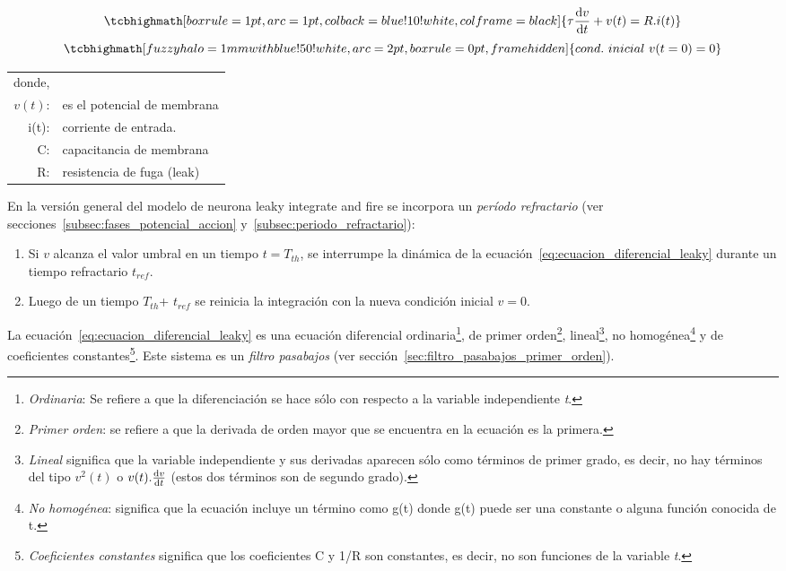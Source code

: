 \begin{equation}\label{eq:ecuacion_diferencial_leaky}
    \tcbhighmath[boxrule=1pt,arc=1pt,colback=blue!10!white,colframe=black]{\tau \dv{v}{t} + v(t) = R.i(t)}
\end{equation}
\[\tcbhighmath[fuzzy halo=1mm with blue!50!white,arc=2pt,
  boxrule=0pt,frame hidden]{cond.\ inicial\ v(t=0)= 0}\]
\begin{center}
\begin{tabular}{ r l}
\footnotesize{donde,}&\\
 \footnotesize{$v(t)$:}& \footnotesize{es el potencial de membrana}\\ 
 \footnotesize{i(t)}:& \footnotesize{corriente de entrada.}\\
 \footnotesize{C:}& \footnotesize{capacitancia de membrana}\\
 \footnotesize{R}:& \footnotesize{resistencia de fuga (leak)}
\end{tabular}
\end{center}
En la versión general del modelo de neurona leaky integrate and fire se incorpora un \textit{período refractario} (ver secciones~\ref{subsec:fases_potencial_accion} y~\ref{subsec:periodo_refractario}):
\begin{enumerate}
    \item Si $v$ alcanza el valor umbral en un tiempo $t=T_{th}$, se interrumpe la dinámica de la ecuación~\ref{eq:ecuacion_diferencial_leaky} durante un tiempo refractario $t_{ref}$.
    \item Luego de un tiempo $T_{th}$+ $t_{ref}$ se reinicia la integración con la nueva condición inicial $v=0$.
\end{enumerate}
La ecuación~\ref{eq:ecuacion_diferencial_leaky} es una ecuación diferencial ordinaria\footnote{\textit{Ordinaria}: Se refiere a que la diferenciación se hace sólo con respecto a la variable independiente \textit{t}.}, de primer orden\footnote{\textit{Primer orden}: se refiere a que la derivada de orden mayor que se encuentra en la ecuación es la primera.}, lineal\footnote{\textit{Lineal} significa que la variable independiente y sus derivadas aparecen sólo como términos de primer grado, es decir, no hay términos del tipo $v^2(t)$ o $v(t).\dv{v}{t}$ (estos dos términos son de segundo grado).}, no homogénea\footnote{\footnotesize \textit{No homogénea}: significa que la ecuación incluye un término como g(t) donde g(t) puede ser una constante o alguna función conocida de t.} y de coeficientes constantes\footnote{\textit{Coeficientes constantes} significa que los coeficientes C y 1/R son constantes, es decir, no son funciones de la variable \textit{t}.}. Este sistema es un \textit{filtro pasabajos} (ver sección~\ref{sec:filtro_pasabajos_primer_orden}). \\
